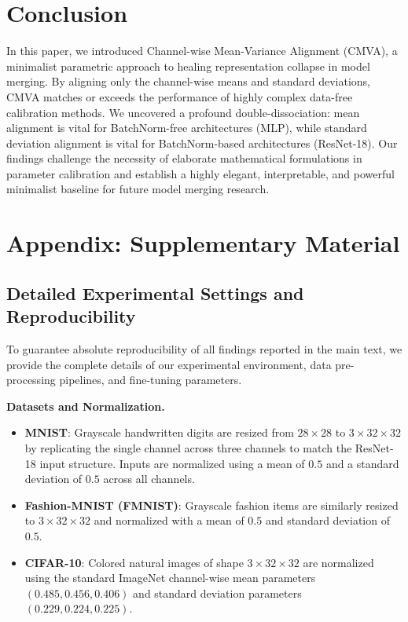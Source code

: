 \documentclass{article}
\theoremstyle{plain}
\theoremstyle{definition}
\theoremstyle{remark}
\begin{document}
\section{Conclusion}
\label{sec:conclusion}

In this paper, we introduced Channel-wise Mean-Variance Alignment (CMVA), a minimalist parametric approach to healing representation collapse in model merging. By aligning only the channel-wise means and standard deviations, CMVA matches or exceeds the performance of highly complex data-free calibration methods. We uncovered a profound double-dissociation: mean alignment is vital for BatchNorm-free architectures (MLP), while standard deviation alignment is vital for BatchNorm-based architectures (ResNet-18). Our findings challenge the necessity of elaborate mathematical formulations in parameter calibration and establish a highly elegant, interpretable, and powerful minimalist baseline for future model merging research.

\nocite{*}



\clearpage
\onecolumn
\appendix
\section{Appendix: Supplementary Material}

\subsection{Detailed Experimental Settings and Reproducibility}
\label{app:reproducibility}

To guarantee absolute reproducibility of all findings reported in the main text, we provide the complete details of our experimental environment, data pre-processing pipelines, and fine-tuning parameters.

\textbf{Datasets and Normalization.}
\begin{itemize}
  \item \textbf{MNIST}: Grayscale handwritten digits are resized from $28 \times 28$ to $3 \times 32 \times 32$ by replicating the single channel across three channels to match the ResNet-18 input structure. Inputs are normalized using a mean of $0.5$ and a standard deviation of $0.5$ across all channels.
  \item \textbf{Fashion-MNIST (FMNIST)}: Grayscale fashion items are similarly resized to $3 \times 32 \times 32$ and normalized with a mean of $0.5$ and standard deviation of $0.5$.
  \item \textbf{CIFAR-10}: Colored natural images of shape $3 \times 32 \times 32$ are normalized using the standard ImageNet channel-wise mean parameters $(0.485, 0.456, 0.406)$ and standard deviation parameters $(0.229, 0.224, 0.225)$.
\end{itemize}
\end{document}

